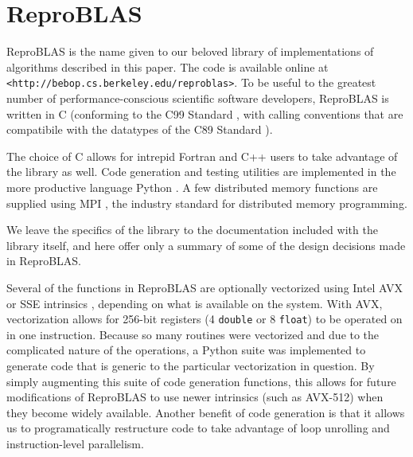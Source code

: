 \section{ReproBLAS}
  \label{sec:reproBLAS}
  ReproBLAS is the name given to our beloved library of implementations of algorithms described in this paper.
  The code is available online at \texttt{<http://bebop.cs.berkeley.edu/reproblas>}.
  To be useful to the greatest number of performance-conscious scientific software developers, ReproBLAS is written in C (conforming to the C99 Standard \cite{c99}, with calling conventions that are compatibile with the datatypes of the C89 Standard \cite{c89}).
\begin{comment}
 complex types \cite{c89} as discussed in \cite{cblasinterface}
Because the C89 standard did not standardize the complex floating point type, all interfaces refer to complex types using \texttt{void*} pointers. If a function would normally return a complex type, a \texttt{void*} pointer is added as the last argument and the function name is suffixed by \texttt{_sub}
\end{comment}
  The choice of C allows for intrepid Fortran and C++ users to take advantage of the library as well.
  Code generation and testing utilities are implemented in the more productive language Python \cite{python}.
  A few distributed memory functions are supplied using MPI \cite{MPI}, the industry standard for distributed memory programming.

  We leave the specifics of the library to the documentation included with the library itself, and here offer only a summary of some of the design decisions made in ReproBLAS.

  Several of the functions in ReproBLAS are optionally vectorized using Intel AVX or SSE intrinsics \cite{SSEAVX}, depending on what is available on the system. With AVX, vectorization allows for 256-bit registers (4 \texttt{double} or 8 \texttt{float}) to be operated on in one instruction. Because so many routines were vectorized and due to the complicated nature of the operations, a Python suite was implemented to generate code that is generic to the particular vectorization in question. By simply augmenting this suite of code generation functions, this allows for future modifications of ReproBLAS to use newer intrinsics (such as AVX-512) when they become widely available. Another benefit of code generation is that it allows us to programatically restructure code to take advantage of loop unrolling and instruction-level parallelism.

